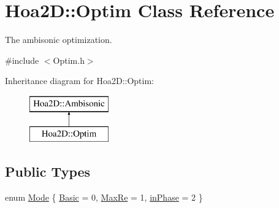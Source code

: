 \hypertarget{class_hoa2_d_1_1_optim}{\section{Hoa2\-D\-:\-:Optim Class Reference}
\label{class_hoa2_d_1_1_optim}
}


The ambisonic optimization.  




{\ttfamily \#include $<$Optim.\-h$>$}

Inheritance diagram for Hoa2\-D\-:\-:Optim\-:\begin{figure}[H]
\begin{center}
\leavevmode
\includegraphics[height=2.000000cm]{class_hoa2_d_1_1_optim}
\end{center}
\end{figure}
\subsection*{Public Types}
\begin{DoxyCompactItemize}
\item 
enum \hyperlink{class_hoa2_d_1_1_optim_ae40f22368cb55699cf19729e37c0aff3}{Mode} \{ \hyperlink{class_hoa2_d_1_1_optim_ae40f22368cb55699cf19729e37c0aff3af5bbb98a42968855f2f43d9a708ae8d2}{Basic} = 0, 
\hyperlink{class_hoa2_d_1_1_optim_ae40f22368cb55699cf19729e37c0aff3a6b8b2446e2cffae18f5f4625b68e0f21}{Max\-Re} = 1, 
\hyperlink{class_hoa2_d_1_1_optim_ae40f22368cb55699cf19729e37c0aff3a7cbed6ffe52c3bd78de0fafc03a6bbb7}{in\-Phase} = 2
 \}
\end{DoxyCompactItemize}
